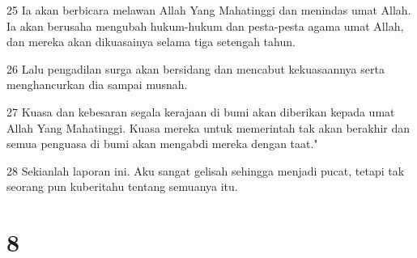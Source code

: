 \par 25 Ia akan berbicara melawan Allah Yang Mahatinggi dan menindas umat Allah. Ia akan berusaha mengubah hukum-hukum dan pesta-pesta agama umat Allah, dan mereka akan dikuasainya selama tiga setengah tahun.
\par 26 Lalu pengadilan surga akan bersidang dan mencabut kekuasaannya serta menghancurkan dia sampai musnah.
\par 27 Kuasa dan kebesaran segala kerajaan di bumi akan diberikan kepada umat Allah Yang Mahatinggi. Kuasa mereka untuk memerintah tak akan berakhir dan semua penguasa di bumi akan mengabdi mereka dengan taat."
\par 28 Sekianlah laporan ini. Aku sangat gelisah sehingga menjadi pucat, tetapi tak seorang pun kuberitahu tentang semuanya itu.

\chapter{8}

